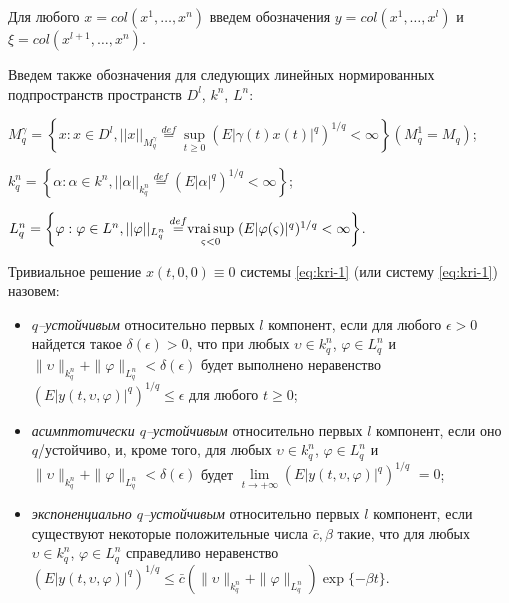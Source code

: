 Для любого $x = col (x^1, \dots, x^n)$ введем обозначения $y =  col
(x^1, \dots, x^l)$ и \\$\xi = col (x^{l+1                   }, \dots,
x^n)$.

Введем также обозначения для следующих линейных нормированных
подпространств пространств $D^l$, $k^n$, $L^n$:

$ M_q^{\gamma } = \left \{x: x \in D^l, ||x||_{M_q^\gamma }
 \mathrel
 {\mathop {=} \limits ^{def}} \mathrel {\mathop {\sup}
 \limits _{t
 \ge 0}} (E|\gamma (t)x(t)|^q)^{1/q} < \infty \right \}  (
 M_q^1 = M_q)$;

$ k_q^n = \left \{\alpha: \alpha \in k^n, ||\alpha ||_{k_q^n}
 \mathrel
 {\mathop {=} \limits ^{def}} (E|\alpha |^q)^{1/q} < \infty
 \right  \}$;

 $L_q^n = \left \{\varphi: \varphi \in L^n,
 ||\varphi||_{L_q^n}
 \mathrel {\mathop {=} \limits ^{def}} \mathrel {\mathop
 {\operatorname*{vrai} \sup}
 \limits _{\varsigma < 0}}(E|\varphi (\varsigma ) |^q)^{1/q} < \infty
 \right \}$.


\begin{definition}\label{def:kri-2}
    Тривиальное решение $x(t,0, 0)\equiv 0$
    системы \eqref{eq:kri-1} (или систему \eqref{eq:kri-1}) назовем:

    \begin{itemize}
        \item {\it $q$--устойчивым} относительно первых $l$ компонент, если
        для любого $\epsilon > 0$ найдется такое $\delta (\epsilon) > 0$,
        что при любых $\upsilon \in k^n_q$, $\varphi \in L^n_q$ и
        $\|\upsilon\|_{k^n_q} + \|\varphi \|_{L^n_q} < \delta (\epsilon)$
        будет выполнено неравенство $(E|y(t,\upsilon, \varphi)|^q)^{1/q} \le
        \epsilon $ для любого $t \ge 0$;

        \item {\it асимптотически $q$--устойчивым }относительно первых $l$ компонент, если
        оно $q$\-/устойчиво, и, кроме того, для любых $\upsilon \in
        k^n_q$, $\varphi \in L^n_q$ и $\|\upsilon\|_{k^n_q} + \|\varphi
        \|_{L^n_q} < \delta (\epsilon)$ будет $\lim \limits_{t  \rightarrow
        +\infty }(E|y(t,\upsilon, \varphi)|^q)^{1/q}$ $ = 0$;

        \item {\it экспоненциально $q$--устойчивым }относительно первых $l$ компонент, если
        сущест\-вуют некоторые положительные числа $\bar c, \beta$ такие, что
        для любых $\upsilon \in k^n_q$, $\varphi \in L^n_q$ справедливо
        неравенство $(E|y(t,\upsilon, \varphi)|^q)^{1/q} \le \bar
        c\left(\|\upsilon\|_{k^n_q} + \|\varphi \|_{L^n_q}\right)\exp
        \{-\beta t\}$.
    \end{itemize}
\end{definition}

